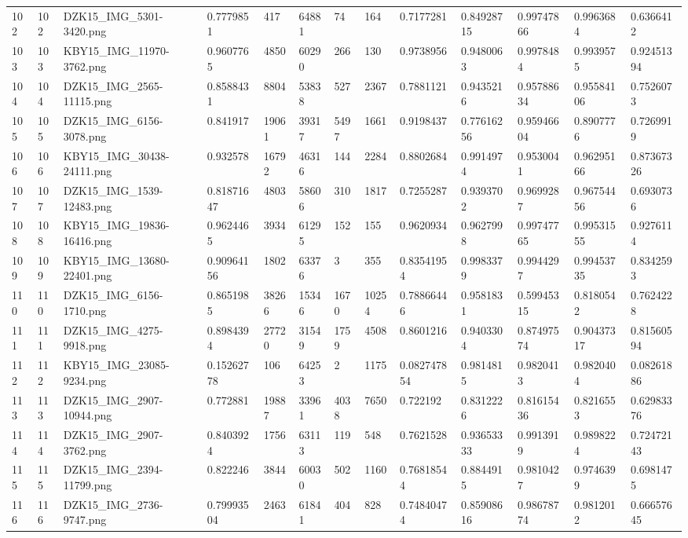 \documentclass[11pt, a4paper, twoside]{report}
\begin{document}
\begin{longtable}[c]{@{}lllllllllllll@{}}
102 & 102 & DZK15\_IMG\_5301-3420.png & 0.7779851 & 417 & 64881 & 74 & 164 & 0.7177281 & 0.84928715 & 0.99747866 & 0.9963684 & 0.6366412 \\
103 & 103 & KBY15\_IMG\_11970-3762.png & 0.9607765 & 4850 & 60290 & 266 & 130 & 0.9738956 & 0.9480063 & 0.9978484 & 0.9939575 & 0.92451394 \\
104 & 104 & DZK15\_IMG\_2565-11115.png & 0.8588431 & 8804 & 53838 & 527 & 2367 & 0.7881121 & 0.9435216 & 0.95788634 & 0.95584106 & 0.7526073 \\
105 & 105 & DZK15\_IMG\_6156-3078.png & 0.841917 & 19061 & 39317 & 5497 & 1661 & 0.9198437 & 0.77616256 & 0.95946604 & 0.8907776 & 0.7269919 \\
106 & 106 & KBY15\_IMG\_30438-24111.png & 0.932578 & 16792 & 46316 & 144 & 2284 & 0.8802684 & 0.9914974 & 0.9530041 & 0.96295166 & 0.87367326 \\
107 & 107 & DZK15\_IMG\_1539-12483.png & 0.81871647 & 4803 & 58606 & 310 & 1817 & 0.7255287 & 0.9393702 & 0.9699287 & 0.96754456 & 0.6930736 \\
108 & 108 & KBY15\_IMG\_19836-16416.png & 0.9624465 & 3934 & 61295 & 152 & 155 & 0.9620934 & 0.9627998 & 0.99747765 & 0.99531555 & 0.9276114 \\
109 & 109 & KBY15\_IMG\_13680-22401.png & 0.90964156 & 1802 & 63376 & 3 & 355 & 0.83541954 & 0.9983379 & 0.9944297 & 0.99453735 & 0.8342593 \\
110 & 110 & DZK15\_IMG\_6156-1710.png & 0.8651985 & 38266 & 15346 & 1670 & 10254 & 0.78866446 & 0.9581831 & 0.59945315 & 0.8180542 & 0.7624228 \\
111 & 111 & DZK15\_IMG\_4275-9918.png & 0.8984394 & 27720 & 31549 & 1759 & 4508 & 0.8601216 & 0.9403304 & 0.87497574 & 0.90437317 & 0.81560594 \\
112 & 112 & KBY15\_IMG\_23085-9234.png & 0.15262778 & 106 & 64253 & 2 & 1175 & 0.082747854 & 0.9814815 & 0.9820413 & 0.9820404 & 0.08261886 \\
113 & 113 & DZK15\_IMG\_2907-10944.png & 0.772881 & 19887 & 33961 & 4038 & 7650 & 0.722192 & 0.8312226 & 0.81615436 & 0.8216553 & 0.62983376 \\
114 & 114 & DZK15\_IMG\_2907-3762.png & 0.8403924 & 1756 & 63113 & 119 & 548 & 0.7621528 & 0.93653333 & 0.9913919 & 0.9898224 & 0.72472143 \\
115 & 115 & DZK15\_IMG\_2394-11799.png & 0.822246 & 3844 & 60030 & 502 & 1160 & 0.76818544 & 0.8844915 & 0.9810427 & 0.9746399 & 0.6981475 \\
116 & 116 & DZK15\_IMG\_2736-9747.png & 0.79993504 & 2463 & 61841 & 404 & 828 & 0.74840474 & 0.85908616 & 0.98678774 & 0.9812012 & 0.66657645 \\

\end{longtable}
\end{document}
